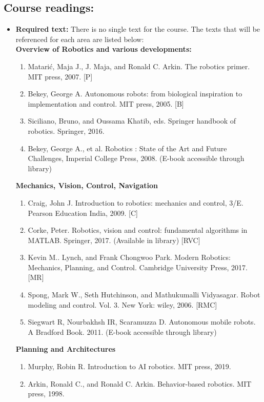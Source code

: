 \documentclass[a4paper]{article}
\begin{document}
\subsection*{Course readings:}
\begin{itemize}
\item \textbf{Required text:} There is no single text for the course. The texts that will be referenced for each area are listed below:\\

	\textbf{Overview of Robotics and various developments:}
	\begin{enumerate}[label=(\alph*)]
		\item Matarić, Maja J., J. Maja, and Ronald C. Arkin. The robotics primer. MIT press, 2007. [P]
		\item Bekey, George A. Autonomous robots: from biological inspiration to implementation and control. MIT press, 2005. [B] 
		\item Siciliano, Bruno, and Oussama Khatib, eds. Springer handbook of robotics. Springer, 2016.
		\item Bekey, George A., et al. Robotics : State of the Art and Future Challenges, Imperial College Press, 2008. (E-book accessible through library)
	\end{enumerate}
	\textbf{Mechanics, Vision, Control, Navigation}
	\begin{enumerate}[label=(\alph*)]
		\item Craig, John J. Introduction to robotics: mechanics and control, 3/E. Pearson Education India, 2009. [C] 
		\item Corke, Peter. Robotics, vision and control: fundamental algorithms in MATLAB. Springer, 2017. (Available in library) [RVC] 
		\item Kevin M.. Lynch, and Frank Chongwoo Park. Modern Robotics: Mechanics, Planning, and Control. Cambridge University Press, 2017. [MR] 
		\item Spong, Mark W., Seth Hutchinson, and Mathukumalli Vidyasagar. Robot modeling and control. Vol. 3. New York: wiley, 2006. [RMC]				
		\item Siegwart R, Nourbakhsh IR, Scaramuzza D. Autonomous mobile robots. A Bradford Book. 2011. (E-book accessible through library)
	\end{enumerate}
	\textbf{Planning and Architectures}
	\begin{enumerate}[label=(\alph*)]
		\item Murphy, Robin R. Introduction to AI robotics. MIT press, 2019.
		\item Arkin, Ronald C., and Ronald C. Arkin. Behavior-based robotics. MIT press, 1998.

\end{enumerate}
\end{itemize}
\end{document}
